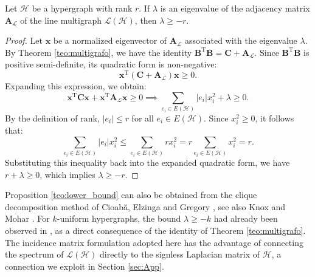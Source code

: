 \documentclass[12pt,reqno]{amsart}
\begin{document}
\begin{proposition}\label{teo:lower_bound}
Let $\mathcal{H}$ be a hypergraph with rank $r$. If $\lambda$ is an eigenvalue of the adjacency matrix $\mathbf{A}_{\mathcal{L}}$ of the line multigraph $\mathcal{L}(\mathcal{H})$, then $\lambda \geq -r$.
\end{proposition}
\begin{proof}

Let $\mathbf{x}$ be a normalized eigenvector of $\mathbf{A}_{\mathcal{L}}$ associated with the eigenvalue $\lambda$. By Theorem \ref{teo:multigrafo}, we have the identity $\mathbf{B}^\mathrm{T}\mathbf{B} = \mathbf{C} + \mathbf{A}_{\mathcal{L}}$. Since $\mathbf{B}^\mathrm{T}\mathbf{B}$ is positive semi-definite, its quadratic form is non-negative:
\begin{equation*}
\mathbf{x}^\mathrm{T} (\mathbf{C} + \mathbf{A}_{\mathcal{L}}) \mathbf{x} \geq 0. 
\end{equation*}
Expanding this expression, we obtain:
\begin{equation*}
\mathbf{x}^\mathrm{T} \mathbf{C} \mathbf{x} + \mathbf{x}^\mathrm{T} \mathbf{A}_{\mathcal{L}} \mathbf{x} \geq 0 \implies \sum_{e_i \in E(\mathcal{H})} |e_i|x_i^2 + \lambda \geq 0.
\end{equation*}
By the definition of rank, $|e_i| \leq r$ for all $e_i \in E(\mathcal{H})$. Since $x_i^2 \geq 0$, it follows that:
\begin{equation*}
\sum_{e_i \in E(\mathcal{H})} |e_i|x_i^2 \leq \sum_{e_i \in E(\mathcal{H})} r x_i^2 = r \sum_{e_i \in E(\mathcal{H})} x_i^2 = r.
\end{equation*}
Substituting this inequality back into the expanded quadratic form, we have $r + \lambda \geq 0$, which implies $\lambda \geq -r$.
\end{proof}

\begin{remark}\label{rem:decomposition}
Proposition \ref{teo:lower_bound} can also be obtained from the clique decomposition method of Cioabă, Elzinga and Gregory \cite[Theorem 2.1 and Corollary 3.1]{smallest-eigenvalue}, see also Knox and Mohar \cite{knox-mohar}. For $k$-uniform hypergraphs, the bound $\lambda \geq -k$ had already been observed in \cite{kaue-lap}, as a direct consequence of the identity of Theorem \ref{teo:multigrafo}. The incidence matrix formulation adopted here has the advantage of connecting the spectrum of $\mathcal{L}(\mathcal{H})$ directly to the signless Laplacian matrix of $\mathcal{H}$, a connection we exploit in Section \ref{sec:App}.
\end{remark}
\end{document}
